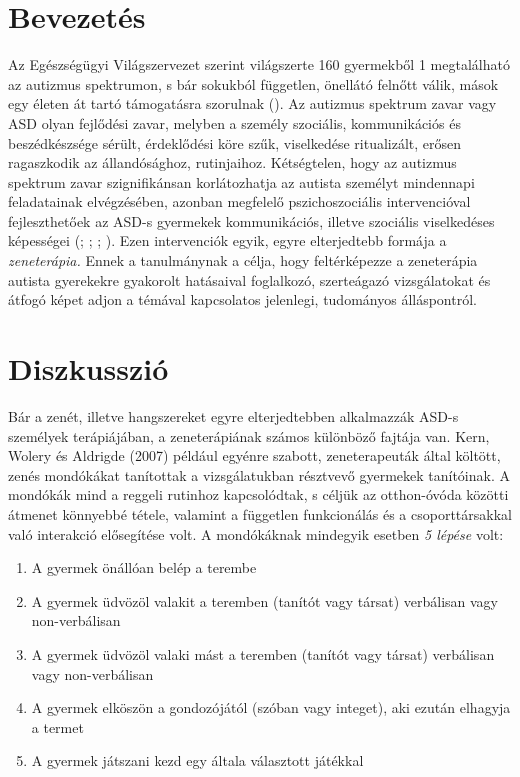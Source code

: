 \section{Bevezetés}

Az Egészségügyi Világszervezet szerint világ\-szerte 160 gyermekből 1 megtalálható az autizmus spektrumon, s bár sokukból független, önellátó felnőtt válik, mások egy életen át tartó támogatásra szorulnak (\cite{WHO}). Az autizmus spektrum zavar vagy ASD olyan fejlődési zavar, melyben a személy szociális, kommunikációs és beszédkészsége sérült, érdeklődési köre szűk, viselkedése ritualizált, erősen ragaszkodik az állandósághoz, rutinjaihoz. Kétségtelen, hogy az autizmus spektrum zavar szignifikánsan korlátozhatja az autista személyt mindennapi feladatainak elvégzésé\-ben, azonban megfelelő pszichoszociális intervencióval fejleszthetőek az ASD-s gyermekek kommunikációs, illetve szociális viselkedéses képességei (\textcite{boso_emanuele_minazzi_abbamonte_politi_2007}; \textcite{finnigan_starr_2010}; \textcite{kern_wolery_aldridge_2006}; \textcite{kim_wigram_gold_2009}). Ezen intervenciók egyik, egyre elterjedtebb formája a \textit{zeneterápia.} Ennek a tanulmánynak a célja, hogy feltérképezze a zeneterápia autista gyerekekre gyakorolt hatásaival foglalkozó, szerteágazó vizsgá\-latokat és átfogó képet adjon a témával kapcsolatos jelenlegi, tudományos álláspontról.
\pagebreak
\section{Diszkusszió}

Bár a zenét, illetve hangszereket egyre elterjedtebben alkalmazzák ASD-s személyek terápiájában, a zeneterápiának számos különböző fajtája van. Kern, Wolery és Aldrigde (2007) például egyénre szabott, zeneterapeuták által költött, zenés mondóká\-kat tanítottak a vizsgálatukban résztvevő gyermekek tanítóinak. A mondókák mind a reggeli rutinhoz kapcsolódtak, s céljük az otthon-óvóda közötti átmenet könnyebbé tétele, valamint a független funkcionálás és a csoporttársakkal való interakció elősegí\-tése volt. A mondó\-káknak mindegyik esetben \textit{5 lépése} volt:

\begin{enumerate}
	\item A gyermek önállóan belép a terembe
	
	\item A gyermek üdvözöl valakit a teremben (tanítót vagy társat) verbálisan vagy non-verbálisan
	
	\item A gyermek üdvözöl valaki mást a teremben (tanítót vagy társat) verbálisan vagy non-verbálisan
	
	\item A gyermek elköszön a gondozójától (szóban vagy integet), aki ezután elhagyja a termet
	
	\item A gyermek játszani kezd egy általa választott játékkal
\end{enumerate}

